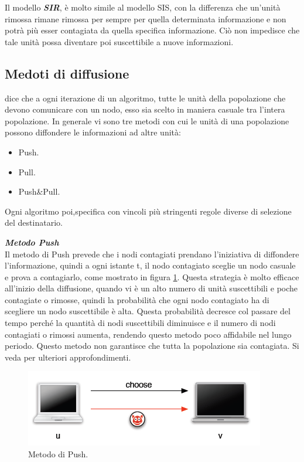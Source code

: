 Il modello \textbf{\textit{\acf{SIR}}}\cite{schindel2004-epidemicAlg}, è molto simile al modello \acs{SIS}, con la differenza che un'unità rimossa rimane rimossa per sempre per quella determinata informazione e non potrà più esser contagiata da quella specifica informazione. Ciò non impedisce che tale unità possa diventare poi suscettibile a nuove informazioni.

\subsection{Medoti di diffusione}
\cite{schindel2004-epidemicAlg} dice che a ogni iterazione di un  algoritmo, tutte le unità della popolazione che devono comunicare con un nodo, esso sia scelto in maniera casuale tra l'intera popolazione. In generale vi sono tre metodi con cui le unità di una popolazione possono diffondere le informazioni ad altre unità:
\begin{itemize}
	\item Push.
	\item Pull.
	\item Push\&Pull.
\end{itemize}
Ogni algoritmo poi,specifica con vincoli più stringenti regole diverse di selezione del destinatario.
\bigskip

\noindent\textbf{\textit{Metodo Push}}\\
Il metodo di Push prevede che i nodi contagiati prendano l'iniziativa di diffondere l'informazione, quindi a ogni istante t, il nodo contagiato sceglie un nodo casuale e prova a contagiarlo, come mostrato in figura \ref{fig:push}. Questa strategia è molto efficace all'inizio della diffusione, quando vi è un alto numero di unità suscettibili e poche contagiate o rimosse, quindi la probabilità che ogni nodo contagiato ha di scegliere un nodo suscettibile è alta. Questa probabilità decresce col passare del tempo perché la quantità di nodi suscettibili diminuisce e il numero di nodi contagiati o rimossi aumenta, rendendo questo metodo poco affidabile nel lungo periodo. Questo metodo non garantisce che tutta la popolazione sia contagiata. Si veda \cite{schindel2004-epidemicAlg} per ulteriori approfondimenti.

\begin{figure}[bh]
	\centering
	\includegraphics[width=0.6\linewidth,keepaspectratio]{Images/algoritmi_gossip/push}
	\caption[Metodo di Push]{Metodo di Push\cite{schindel2004-epidemicAlg}.}
	\label{fig:push}
\end{figure}
\bigskip


